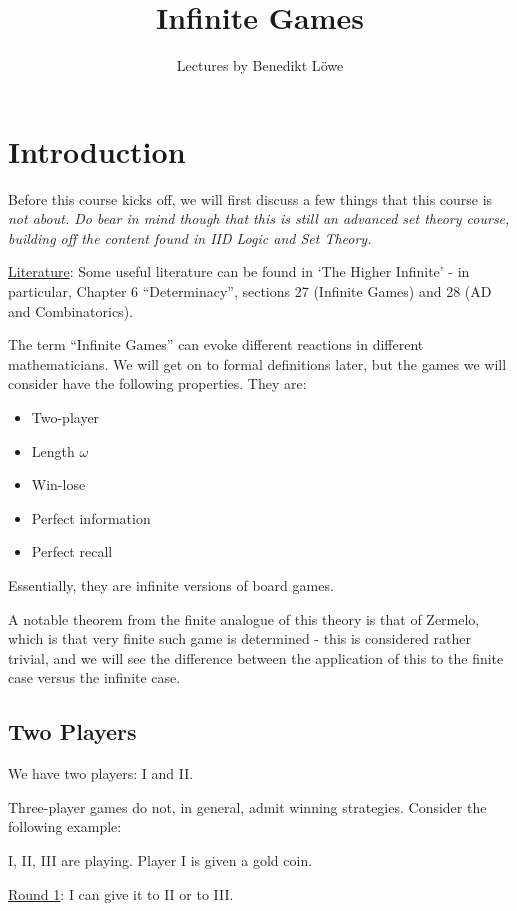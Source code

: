 \documentclass[]{article}
\title{Infinite Games}
\author{Lectures by Benedikt L{\"o}we}
\date{}
\begin{document}
\maketitle



\section{Introduction}
Before this course kicks off, we will first discuss a few things that this course is \it{not} about. Do bear in mind though that this is still an advanced set theory course, building off the content found in IID Logic and Set Theory.

\underline{Literature}: Some useful literature can be found in `The Higher Infinite' - in particular, Chapter 6 ``Determinacy'', sections 27 (Infinite Games) and 28 (AD and Combinatorics).

The term ``Infinite Games'' can evoke different reactions in different mathematicians. We will get on to formal definitions later, but the games we will consider have the following properties. They are:
\begin{itemize}
    \item Two-player
    \item Length $\omega$
    \item Win-lose
    \item Perfect information
    \item Perfect recall
\end{itemize}
Essentially, they are infinite versions of board games.

A notable theorem from the finite analogue of this theory is that of Zermelo, which is that very finite such game is determined - this is considered rather trivial, and we will see the difference between the application of this to the finite case versus the infinite case.

\subsection{Two Players}

We have two players: I and II.

Three-player games do not, in general, admit winning strategies. Consider the following example:

I, II, III are playing. Player I is given a gold coin.

\underline{Round 1}: I can give it to II or to III.
\end{document}
